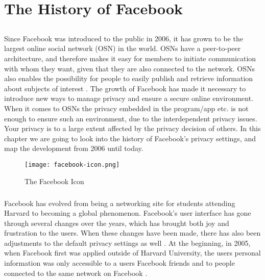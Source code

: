 \chapter{The History of Facebook}
\label{chp:facebookhistory} 

\section{}\label{sec:first_section}
\paragraph{}
Since Facebook was introduced to the public in 2006, it has grown to be the largest online social network (OSN) in the world. OSNs have a peer-to-peer architecture, and therefore makes it easy for members to initiate communication with whom they want, given that they are also connected to the network. OSNs also enables the possibility for people to easily publish and retrieve information about subjects of interest \cite{DPBook}. The growth of Facebook has made it necessary to introduce new ways to manage privacy and ensure a secure online environment. When it comes to OSNs the privacy embedded in the program/app etc. is not enough to ensure such an environment, due to the interdependent privacy issues. Your privacy is to a large extent affected by the privacy decision of others. In this chapter we are going to look into the history of Facebook’s privacy settings, and map the development from 2006 until today. 

\begin{figure}[h!]
\centering
\texttt{[image: facebook-icon.png]}
\caption{The Facebook Icon}
\end{figure}

\paragraph{}
Facebook has evolved from being a networking site for students attending Harvard to becoming a global phenomenon. Facebook's user interface has gone through several changes over the years, which has brought both joy and frustration to the users. When these changes have been made, there has also been adjustments to the default privacy settings as well \cite{EvoPriv2}. At the beginning, in 2005, when Facebook first was applied outside of Harvard University, the users personal information was only accessible to a users Facebook friends and to people connected to the same network on Facebook \cite{EvoPriv}. 


